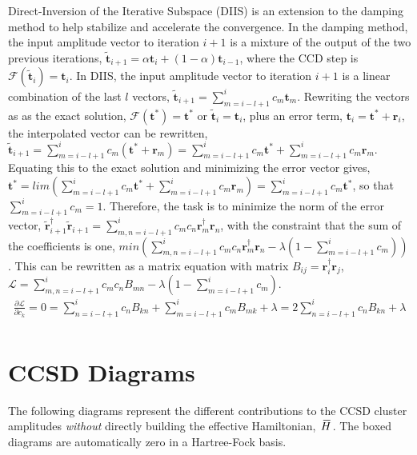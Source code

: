 \documentclass[thesis.tex]{subfiles}
\begin{document}
Direct-Inversion of the Iterative Subspace (DIIS) is an extension to the damping method to help stabilize and accelerate the convergence. In the damping method, the input amplitude vector to iteration $i+1$ is a mixture of the output of the two previous iterations, $\mathbf{\tilde{t}}_{i+1}=\alpha\mathbf{t}_{i}+\left(1-\alpha\right)\mathbf{t}_{i-1}$, where the CCD step is $\mathcal{F}\left(\mathbf{\tilde{t}}_{i}\right)=\mathbf{t}_{i}$. In DIIS, the input amplitude vector to iteration $i+1$ is a linear combination of the last $l$ vectors, $\mathbf{\tilde{t}}_{i+1}=\sum_{m=i-l+1}^{i}c_{m}\mathbf{t}_{m}$. Rewriting the vectors as as the exact solution, $\mathcal{F}\left(\mathbf{t^{*}}\right)=\mathbf{t^{*}}$ or $\mathbf{\tilde{t}}_{i}=\mathbf{t}_{i}$, plus an error term, $\mathbf{t}_{i}=\mathbf{t^{*}}+\mathbf{r}_{i}$, the interpolated vector can be rewritten, $\mathbf{\tilde{t}}_{i+1}=\sum_{m=i-l+1}^{i}c_{m}\left(\mathbf{t^{*}}+\mathbf{r}_{m}\right)=\sum_{m=i-l+1}^{i}c_{m}\mathbf{t^{*}}+\sum_{m=i-l+1}^{i}c_{m}\mathbf{r}_{m}$. Equating this to the exact solution and minimizing the error vector gives, $\mathbf{t^{*}}=lim\left(\sum_{m=i-l+1}^{i}c_{m}\mathbf{t^{*}}+\sum_{m=i-l+1}^{i}c_{m}\mathbf{r}_{m}\right)=\sum_{m=i-l+1}^{i}c_{m}\mathbf{t^{*}}$, so that $\sum_{m=i-l+1}^{i}c_{m}=1$. Therefore, the task is to minimize the norm of the error vector, $\mathbf{\tilde{r}}_{i+1}^{\dagger}\mathbf{\tilde{r}}_{i+1}=\sum_{m,n=i-l+1}^{i}c_{m}c_{n}\mathbf{r}_{m}^{\dagger}\mathbf{r}_{n}$, with the constraint that the sum of the coefficients is one, $min\left(\sum_{m,n=i-l+1}^{i}c_{m}c_{n}\mathbf{r}_{m}^{\dagger}\mathbf{r}_{n}-\lambda\left(1-\sum_{m=i-l+1}^{i}c_{m}\right)\right)$. This can be rewritten as a matrix equation with matrix $B_{ij}=\mathbf{r}_{i}^{\dagger}\mathbf{r}_{j}$, $\mathcal{L}=\sum_{m,n=i-l+1}^{i}c_{m}c_{n}B_{mn}-\lambda\left(1-\sum_{m=i-l+1}^{i}c_{m}\right)$.
\begin{gather}
\frac{\partial\mathcal{L}}{\partial c_{k}}=0=\sum_{n=i-l+1}^{i}c_{n}B_{kn}+\sum_{m=i-l+1}^{i}c_{m}B_{mk}+\lambda=2\sum_{n=i-l+1}^{i}c_{n}B_{kn}+\lambda \\
\end{gather}

\chapter{CCSD Diagrams}

The following diagrams represent the different contributions to the CCSD cluster amplitudes \textit{without} directly building the effective Hamiltonian, $\EHam$.  The boxed diagrams are automatically zero in a Hartree-Fock basis.
\end{document}
